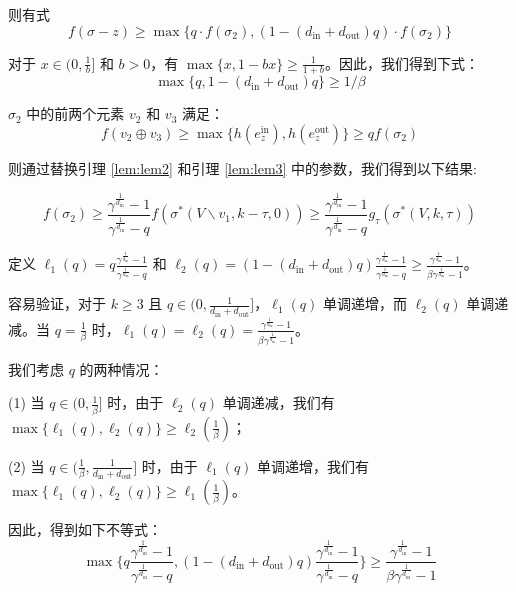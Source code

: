 则有式
\begin{equation}
    f(\sigma-z)\ge \max\{ q \cdot f(\sigma_2),(1-(d_{\text{in}} + d_{\text{out}})q) \cdot f(\sigma_2)\} \label{equ:tau1_ine1}
\end{equation}

对于 $x\in (0,\frac{1}{b}]$ 和 $b>0$，有 $\max\{x,1-bx\} \ge \frac{1}{1+b}$。因此，我们得到下式：
\begin{equation}
    \max\{q,1-(d_{\text{in}} + d_{\text{out}})q\} \ge 1/\beta
\end{equation}

$\sigma_2$ 中的前两个元素 $v_2$ 和 $v_3$ 满足：
\begin{equation}
f(v_2\oplus v_3) \ge \max \{h(e_z^{\text{in}}),h(e_z^{\text{out}})\} \ge q f(\sigma_2) \label{equ:tau1_ine2}
\end{equation}

则通过替换引理 \ref{lem:lem2} 和引理 \ref{lem:lem3} 中的参数，我们得到以下结果:

\begin{equation}
    f(\sigma_2) \ge \frac{\gamma^{\frac{1}{d_{\text{in}}}}-1}{\gamma^{\frac{1}{d_{\text{in}}}}-q} f(\sigma^*(V\backslash v_1,k-\tau,0)) \ge \frac{\gamma^{\frac{1}{d_{\text{in}}}}-1}{\gamma^{\frac{1}{d_{\text{in}}}}-q} g_{\tau} (\sigma^*(V,k,\tau)) \label{equ:tau1_ine3}
\end{equation}

定义 $\ell_1(q) = q \frac{\gamma^{\frac{1}{d_{\text{in}}}}-1}{\gamma^{\frac{1}{d_{\text{in}}}}-q}$ 和 $\ell_2(q) = (1-(d_{\text{in}} + d_{\text{out}})q) \frac{\gamma^{\frac{1}{d_{\text{in}}}}-1}{\gamma^{\frac{1}{d_{\text{in}}}}-q} \ge \frac{\gamma^{\frac{1}{d_{\text{in}}}}-1}{\beta \gamma^{\frac{1}{d_{\text{in}}}}-1}$。

容易验证，对于 $k\ge 3$ 且 $q\in (0,\frac{1}{d_{\text{in}}+d_{\text{out}}}]$，$\ell_1(q)$ 单调递增，而 $\ell_2(q)$ 单调递减。当 $q=\frac{1}{\beta}$ 时，$\ell_1(q)=\ell_2(q)=\frac{\gamma^{\frac{1}{d_{\text{in}}}}-1}{\beta \gamma^{\frac{1}{d_{\text{in}}}}-1}$。

我们考虑 $q$ 的两种情况：

(1) 当 $q \in (0,\frac{1}{\beta}]$ 时，由于 $\ell_2(q)$ 单调递减，我们有 $\max\{\ell_1(q),\ell_2(q)\}\ge \ell_2(\frac{1}{\beta})$；

(2) 当 $q \in (\frac{1}{\beta},\frac{1}{d_{\text{in}}+d_{\text{out}}}]$ 时，由于 $\ell_1(q)$ 单调递增，我们有 $\max\{\ell_1(q),\ell_2(q)\}\ge \ell_1(\frac{1}{\beta})$。

因此，得到如下不等式：
\begin{equation}
    \max\{ q \frac{\gamma^{\frac{1}{d_{\text{in}}}}-1}{\gamma^{\frac{1}{d_{\text{in}}}}-q} , (1-(d_{\text{in}} + d_{\text{out}})q) \frac{\gamma^{\frac{1}{d_{\text{in}}}}-1}{\gamma^{\frac{1}{d_{\text{in}}}}-q} \} \ge \frac{\gamma^{\frac{1}{d_{\text{in}}}}-1}{\beta \gamma^{\frac{1}{d_{\text{in}}}}-1} \label{equ:tau1_ine4}    
\end{equation}

